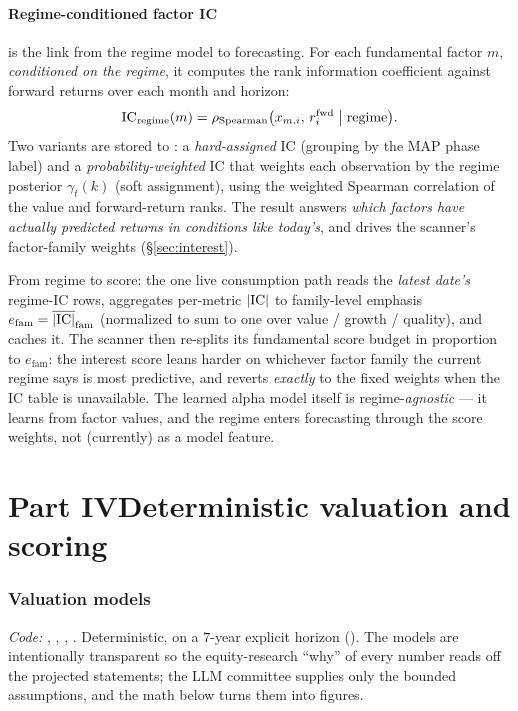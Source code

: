 \documentclass[11pt]{article}
\begin{document}
\subsection{Regime-conditioned factor IC}
\label{sec:regic}
 is the link from the regime model to forecasting. For each
fundamental factor $m$, \emph{conditioned on the regime}, it computes the rank
information coefficient against forward returns over each month and horizon:
\begin{equation}
  \mathrm{IC}_{\text{regime}}(m)=\rho_{\text{Spearman}}\big(x_{m,i},\,r^{\text{fwd}}_i \;\big|\; \text{regime}\big).
\end{equation}
Two variants are stored to : a
\emph{hard-assigned} IC (grouping by the MAP phase label) and a
\emph{probability-weighted} IC that weights each observation by the regime
posterior $\gamma_t(k)$ (soft assignment), using the weighted Spearman correlation
of the value and forward-return ranks. The result answers \emph{which factors have
actually predicted returns in conditions like today's}, and drives the scanner's
factor-family weights (\S\ref{sec:interest}).

\begin{modelbox}{From regime to score: the one live consumption path}
\small
{} reads the \emph{latest date's} regime-IC rows,
aggregates per-metric $|\mathrm{IC}|$ to family-level emphasis
$e_{\text{fam}}=\overline{|\mathrm{IC}|}_{\text{fam}}$ (normalized to sum to one over
value / growth / quality), and caches it. The scanner then re-splits its
fundamental score budget in proportion to $e_{\text{fam}}$: the interest score
leans harder on whichever factor family the current regime says is most
predictive, and reverts \emph{exactly} to the fixed weights when the IC table is
unavailable. The learned alpha model itself is regime-\emph{agnostic} --- it
learns from factor values, and the regime enters forecasting through the score
weights, not (currently) as a model feature.
\end{modelbox}

\part*{Part IV\quad Deterministic valuation and scoring}

\section{Valuation models}
\label{sec:val}
\emph{Code:} , ,
, . Deterministic, on a
$7$-year explicit horizon (). The models are intentionally
transparent so the equity-research ``why'' of every number reads off the projected
statements; the LLM committee supplies only the bounded assumptions, and the math
below turns them into figures.
\end{document}
